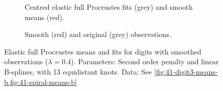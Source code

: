 \begin{figure}
  \centering
  \begin{subfigure}{\textwidth}
    \begin{subfigure}{0.48\textwidth}
    \end{subfigure}\hfill%
    \begin{subfigure}{0.48\textwidth}
    \end{subfigure}
    \caption{Centred elastic full Procrustes fits (grey) and smooth means (red).}
    \label{fig:a-smooth-means-lm}
  \end{subfigure}
  \begin{subfigure}{\textwidth}
    \centering
    \begin{subfigure}{\textwidth}
    \centering
    \end{subfigure}
    \begin{subfigure}{\textwidth}
    \centering
    \end{subfigure}
    \caption{Smooth (red) and original (grey) observations.}
    \label{fig:a-smooth-pfits-lm}
  \end{subfigure}
  \caption{Elastic full Procrustes means and fits for digits with smoothed observations ($\lambda = 0.4$). Parameters: Second order penalty and linear B-splines, with 13 equidistant knots. Data: See \cref{fig:41-digit3-means-b,fig:41-spiral-means-b}}
  \label{fig:a-smooth-lm}
\end{figure}
